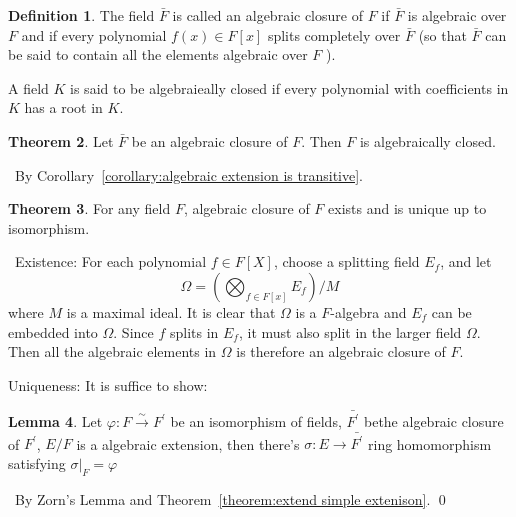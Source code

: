 \documentclass[a4paper,12pt]{article}
\newenvironment{prooff}{{\noindent\it\textcolor{cyan!40!black}{Proof}:}\,}{\par}
\newenvironment{proofff}{{\noindent\it\textcolor{cyan!40!black}{Proof of the lemma}:}\,}{\qed \par}
\newcommand{\p}{^{\prime}}
\theoremstyle{definition}
\newtheorem{defn}{Definition}[subsection]
\newtheorem{theo}[defn]{Theorem}
\newtheorem{lem}[defn]{Lemma}
\begin{document}
\begin{defn}
    The field $\bar{F}$ is called an algebraic closure of $F$ if $\bar{F}$ is algebraic over $F$ and if every polynomial $f(x) \in F[x]$ splits completely over $\bar{F}$ (so that $\bar{F}$ can be said to contain all the elements algebraic over $F$ ).

    A field $K$ is said to be algebraieally closed if every polynomial with coefficients in $K$ has a root in $K$.
\end{defn}
\begin{theo}
    Let $\bar{F}$ be an algebraic closure of $F$. Then $F$ is algebraically closed.
\end{theo}
\begin{prooff}
    By Corollary~\ref{corollary:algebraic extension is transitive}.
\end{prooff}
\begin{theo}
    For any field $F$, algebraic closure of $F$ exists and is unique up to isomorphism.
    \label{lemma:extend algebraic extension}
\end{theo}
\begin{prooff}
    Existence: For each polynomial $f \in F[X]$, choose a splitting field $E_f$, and let $$\Omega=\left(\bigotimes_{f\in F[x]} E_f\right) / M$$ where $M$ is a maximal ideal. It is clear that $\Omega$ is a $F$-algebra and $E_f$ can be embedded into $\Omega$. Since $f$ splits in $E_f$, it must also split in the larger field $\Omega$. Then all the algebraic elements in $\Omega$ is therefore an algebraic closure of $F$.

    Uniqueness: It is suffice to show:

    \begin{lem}
        Let $\varphi: F \xrightarrow{\sim} F^{\prime}$ be an isomorphism of fields, $\bar{F\p}$ bethe algebraic closure of $F\p$, $E/F$ is a algebraic extension, then there's $\sigma:E\rightarrow \bar{F\p}$ ring homomorphism satisfying $\sigma|_{F}=\varphi$
    \end{lem}
    \begin{proofff}
        By Zorn's Lemma and Theorem~\ref{theorem:extend simple extenison}.
    \end{proofff}
\end{prooff}
\end{document}
